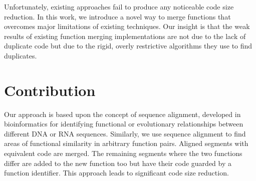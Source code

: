 
Unfortunately, existing approaches fail  to produce any noticeable code size reduction.
In this work, we introduce a novel way to merge functions that overcomes major limitations of existing techniques.
Our insight is that the weak results of existing function merging implementations are not due to the lack of duplicate code but due to the rigid, overly restrictive algorithms they use to find duplicates.


\section{Contribution}

Our approach is based upon the concept of sequence alignment, developed in bioinformatics for identifying functional or evolutionary relationships between different DNA or RNA sequences.
Similarly, we use sequence alignment to find areas of functional similarity in arbitrary function pairs.
Aligned segments with equivalent code are merged.
The remaining segments where the two functions differ are added to the new function too but have their code guarded by a function identifier.
This approach leads to significant code size reduction.

